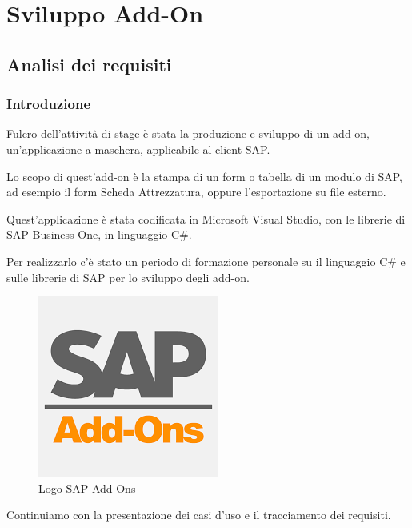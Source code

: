 
\chapter{Sviluppo Add-On}
\label{cap:sviluppo-addon}



\section{Analisi dei requisiti}
\subsection{Introduzione}

\begin{flushleft}
	\item Fulcro dell'attività di stage è stata la produzione e sviluppo di un add-on, un'applicazione a maschera, applicabile al client SAP.
	
	Lo scopo di quest'add-on è la stampa di un form o tabella di un modulo di SAP, ad esempio il form Scheda Attrezzatura, oppure l'esportazione su file esterno.
	\item Quest'applicazione è stata codificata in Microsoft Visual Studio, con le librerie di SAP Business One, in linguaggio C\#.
	
	Per realizzarlo c'è stato un periodo di formazione personale su il linguaggio C\# e sulle librerie di SAP per lo sviluppo degli add-on.
\end{flushleft}
\begin{figure}[!h] 
	\centering
	\includegraphics[scale = 0.4]{immagini/add-on/addon-logo.png} 
	\caption{Logo SAP Add-Ons}
\end{figure}
Continuiamo con la presentazione dei casi d'uso e il tracciamento dei requisiti.
\newpage

